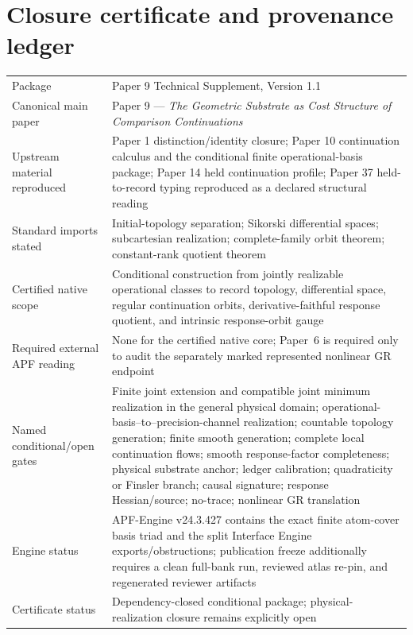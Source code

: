 \documentclass[11pt]{article}
\theoremstyle{remark}
\begin{document}
\tableofcontents



\section{Closure certificate and provenance ledger}\label{sec:ts-closure}

\begin{center}
\begin{tabularx}{\textwidth}{@{}lX@{}}
\toprule
Package & Paper 9 Technical Supplement, Version 1.1\\
Canonical main paper & Paper 9 --- \emph{The Geometric Substrate as Cost Structure of Comparison Continuations}\\
Upstream material reproduced & Paper 1 distinction/identity closure; Paper 10 continuation calculus and the conditional finite operational-basis package; Paper 14 held continuation profile; Paper 37 held-to-record typing reproduced as a declared structural reading\\
Standard imports stated & Initial-topology separation; Sikorski differential spaces; subcartesian realization; complete-family orbit theorem; constant-rank quotient theorem\\
Certified native scope & Conditional construction from jointly realizable operational classes to record topology, differential space, regular continuation orbits, derivative-faithful response quotient, and intrinsic response-orbit gauge\\
Required external APF reading & None for the certified native core; Paper~6 is required only to audit the separately marked represented nonlinear GR endpoint\\
Named conditional/open gates & Finite joint extension and compatible joint minimum realization in the general physical domain; operational-basis--to--precision-channel realization; countable topology generation; finite smooth generation; complete local continuation flows; smooth response-factor completeness; physical substrate anchor; ledger calibration; quadraticity or Finsler branch; causal signature; response Hessian/source; no-trace; nonlinear GR translation\\
Engine status & APF-Engine v24.3.427 contains the exact finite atom-cover basis triad and the split Interface Engine exports/obstructions; publication freeze additionally requires a clean full-bank run, reviewed atlas re-pin, and regenerated reviewer artifacts\\
Certificate status & Dependency-closed conditional package; physical-realization closure remains explicitly open\\
\bottomrule
\end{tabularx}
\end{center}
\end{document}
